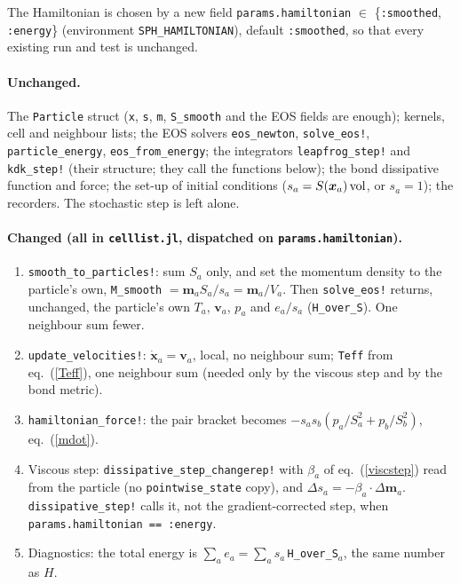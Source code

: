 \documentclass[11pt,aps,preprint,nofootinbib,superscriptaddress,tightenlines]{revtex4-2}
\def\Eq#1{eq.~(\ref{#1})}
\let\oldparagraph\paragraph
\renewcommand{\paragraph}{\par\bigskip\oldparagraph}
\begin{document}
The Hamiltonian is chosen by a new field \texttt{params.hamiltonian} $\in$
\{\texttt{:smoothed}, \texttt{:energy}\} (environment \texttt{SPH\_HAMILTONIAN}),
default \texttt{:smoothed}, so that every existing run and test is unchanged.

\paragraph{Unchanged.}  The \texttt{Particle} struct (\texttt{x}, \texttt{s},
\texttt{m}, \texttt{S\_smooth} and the EOS fields are enough); kernels, cell and
neighbour lists; the EOS solvers \texttt{eos\_newton}, \texttt{solve\_eos!},
\texttt{particle\_energy}, \texttt{eos\_from\_energy}; the integrators
\texttt{leapfrog\_step!} and \texttt{kdk\_step!} (their structure; they call the
functions below); the bond dissipative function and force; the set-up of initial
conditions ($s_a=S(\bm x_a)\,{\rm vol}$, or $s_a=1$); the recorders.  The stochastic
step is left alone.

\paragraph{Changed (all in \texttt{celllist.jl}, dispatched on \texttt{params.hamiltonian}).}
\begin{enumerate}
\item \texttt{smooth\_to\_particles!}: sum $S_a$ only, and set the momentum density to
  the particle's own, \texttt{M\_smooth} $=\bm m_aS_a/s_a=\bm m_a/V_a$.  Then
  \texttt{solve\_eos!} returns, unchanged, the particle's own $T_a$, $\bm v_a$, $p_a$
  and $e_a/s_a$ (\texttt{H\_over\_S}).  One neighbour sum fewer.
\item \texttt{update\_velocities!}: $\dot{\bm x}_a=\bm v_a$, local, no neighbour sum;
  \texttt{Teff} from \Eq{Teff}, one neighbour sum (needed only by the viscous step and
  by the bond metric).
\item \texttt{hamiltonian\_force!}: the pair bracket becomes
  $-s_as_b(p_a/S_a^2+p_b/S_b^2)$, \Eq{mdot}.
\item Viscous step: \texttt{dissipative\_step\_changerep!} with $\beta_a$ of
  \Eq{viscstep} read from the particle (no \texttt{pointwise\_state} copy), and
  $\Delta s_a=-\beta_a\cdot\Delta\bm m_a$.  \texttt{dissipative\_step!} calls it, not
  the gradient-corrected step, when \texttt{params.hamiltonian == :energy}.
\item Diagnostics: the total energy is $\sum_ae_a=\sum_as_a\,$\texttt{H\_over\_S}$_a$,
  the same number as $H$.
\end{enumerate}
\end{document}
